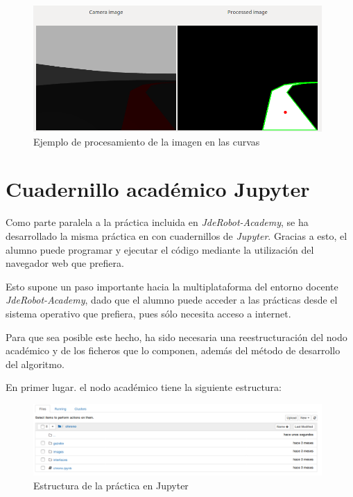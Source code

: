 \begin{figure}[H]
  \begin{center}
    \includegraphics[width=0.98\textwidth]{figures/filtrado_curvas_chrono.png}
		\caption{Ejemplo de procesamiento de la imagen en las curvas}
		\label{fig.pdiecch}
		\end{center}
\end{figure}

\section{Cuadernillo académico Jupyter}
Como parte paralela a la práctica incluida en \textit{JdeRobot-Academy}, se ha desarrollado la misma práctica en con cuadernillos de \textit{Jupyter}. Gracias a esto, el alumno puede programar y ejecutar el código mediante la utilización del navegador web que prefiera.

Esto supone un paso importante hacia la multiplataforma del entorno docente \textit{JdeRobot-Academy}, dado que el alumno puede acceder a las prácticas desde el sistema operativo que prefiera, pues sólo necesita acceso a internet.

Para que sea posible este hecho, ha sido necesaria una reestructuración del nodo académico y de los ficheros que lo componen, además del método de desarrollo del algoritmo.

En primer lugar. el nodo académico tiene la siguiente estructura:

\begin{figure}[H]
  \begin{center}
    \includegraphics[width=0.98\textwidth]{figures/estructura_jupyter.png}
		\caption{Estructura de la práctica en Jupyter}
		\label{fig.ejch}
		\end{center}
\end{figure}

